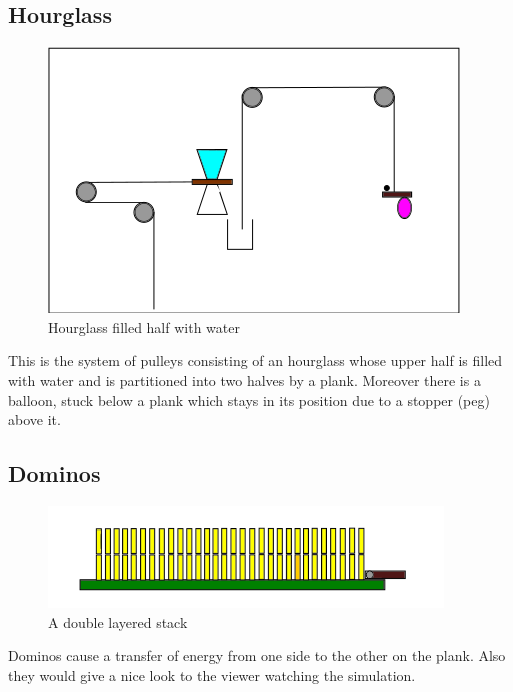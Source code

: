 \documentclass[12pt,a4paper]{article}
\begin{document}
\subsection{Hourglass} \label{hg}
\begin{figure}
\includegraphics[width=0.8\linewidth]{hg.png}
\caption{Hourglass filled half with water}
\end{figure}
This is the system of pulleys consisting of an hourglass whose upper half is filled with water and is partitioned into two halves by a plank. Moreover there is a balloon, stuck below a plank which stays in its position due to a stopper (peg) above it.
\\[10ex]
\subsection{Dominos} \label{dom}
\begin{figure}
\includegraphics[width=0.8\linewidth]{domnios.png}
\caption{A double layered stack}
\end{figure}
Dominos cause a transfer of energy from one side to the other on the plank. Also they would give a nice look to the viewer watching the simulation. 
\\[20ex]
\end{document}
